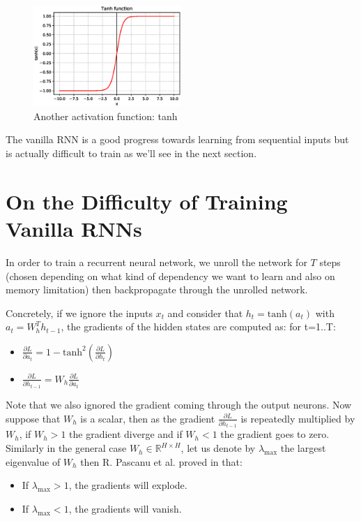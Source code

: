 \begin{figure}[H]
    \centering
    \includegraphics[width=0.5\textwidth]{Images/tanh.eps}
    \caption{Another activation function: tanh}
    \label{tanh}
\end{figure}

The vanilla RNN is a good progress towards learning from sequential inputs but is actually difficult to train as we'll see in the next section.

\section{On the Difficulty of Training Vanilla RNNs}
In order to train a recurrent neural network, we unroll the network for $T$ steps (chosen depending on what kind of dependency we want to learn and also on memory limitation) then backpropagate through the unrolled network.

Concretely, if we ignore the inputs $x_t$ and consider that $h_t = \text{tanh}(a_t)$ with $a_t = W_h^T h_{t-1}$, the gradients of the hidden states are computed as: for t=1..T:
\begin{itemize}
    \item $\frac{\partial L}{\partial a_t} = 1 - \text{tanh}^2(\frac{\partial L}{\partial h_t})$
    \item $\frac{\partial L}{\partial h_{t-1}} = W_h \frac{\partial L}{\partial a_t}$
\end{itemize}

Note that we also ignored the gradient coming through the output neurons. Now suppose that $W_h$ is a scalar, then as the gradient $\frac{\partial L}{\partial h_{t-1}}$ is repeatedly multiplied by $W_h$, if $W_h > 1$ the gradient diverge and if $W_h < 1$ the gradient goes to zero. Similarly in the general case $W_h \in \mathbb{R}^{H\times H}$, let us denote by $\lambda_{\text{max}}$ the largest eigenvalue of $W_h$ then R. Pascanu et al. proved in \cite{difficulty-rnn} that:

\begin{itemize}
    \item If $\lambda_{\text{max}} > 1$, the gradients will explode.
    \item If $\lambda_{\text{max}} < 1$, the gradients will vanish.
\end{itemize}

